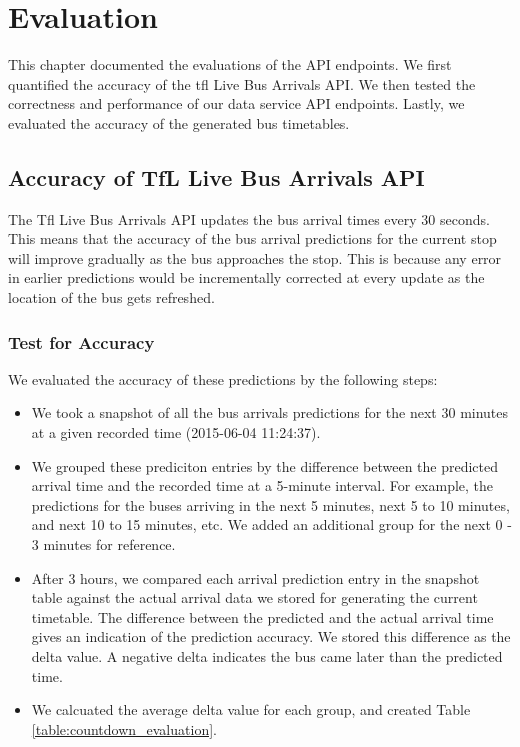 \chapter{Evaluation}
\label{ch:evaluation}
\par This chapter documented the evaluations of the API endpoints. We first quantified the accuracy of the \acrshort{tfl} Live Bus Arrivals API. We then tested the correctness and performance of our data service API endpoints. Lastly, we evaluated the accuracy of the generated bus timetables.

\section{Accuracy of TfL Live Bus Arrivals API}
\label{sec:tfl_stream_accuracy}
\par The Tfl Live Bus Arrivals API updates the bus arrival times every 30 seconds. This means that the accuracy of the bus arrival predictions for the current stop will improve gradually as the bus approaches the stop. This is because any error in earlier predictions would be incrementally corrected at every update as the location of the bus gets refreshed.

\subsection{Test for Accuracy}
\par We evaluated the accuracy of these predictions by the following steps:

\begin{itemize}
  \item We took a snapshot of all the bus arrivals predictions for the next 30 minutes at a given recorded time (2015-06-04 11:24:37).
  \item We grouped these prediciton entries by the difference between the predicted arrival time and the recorded time at a 5-minute interval. For example, the predictions for the buses arriving in the next 5 minutes, next 5 to 10 minutes, and next 10 to 15 minutes, etc. We added an additional group for the next 0 - 3 minutes for reference.
  \item After 3 hours, we compared each arrival prediction entry in the snapshot table against the actual arrival data we stored for generating the current timetable. The difference between the predicted and the actual arrival time gives an indication of the prediction accuracy. We stored this difference as the delta value. A negative delta indicates the bus came later than the predicted time.
  \item We calcuated the average delta value for each group, and created Table \ref{table:countdown_evaluation}.
\end{itemize}

